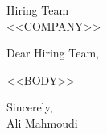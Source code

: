 \documentclass[a4paper,10pt]{letter}
\begin{document}
\begin{letter}{Hiring Team\\<<COMPANY>>}

\opening{Dear Hiring Team,}

<<BODY>>

\raggedright
Sincerely,\\
Ali Mahmoudi

\end{letter}
\end{document}

